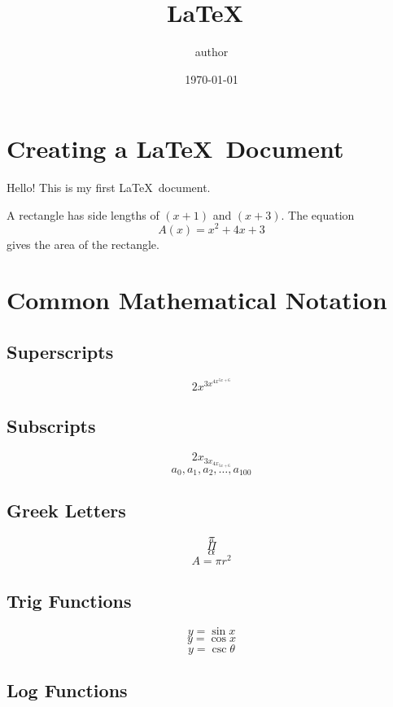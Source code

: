 \documentclass[11pt, a4paper]{article}
\title{ \LaTeX\ }
\author{author}
\date{\today}
\begin{document}
\thispagestyle{empty}
\maketitle
\pagebreak
{}
\setcounter{page}{1}

\tableofcontents
\pagebreak
{}
\setcounter{page}{1}

\pagestyle{fancy}
\fancyhead[L]{ \LaTeX\ }
\fancyhead[R]{\nouppercase{\leftmark}}

\section{Creating a \LaTeX\ Document}
Hello! This is my first \LaTeX\ document.

A rectangle has side lengths of $(x + 1)$ and $(x + 3)$.
The equation $${A(x) = x^2 + 4x + 3}$$ gives the area of the rectangle.

\pagebreak

\section{Common Mathematical Notation}

\subsection{Superscripts}

$$ 2x^{3x^{4x^{5x+6}}} $$

\subsection{Subscripts}

$$ 2x_{3x_{4x_{5x+6}}} $$
$$ a_0, a_1, a_2, \ldots, a_{100} $$

\subsection{Greek Letters}

$$ \pi $$
$$ \Pi $$
$$ \alpha $$
$$ A = \pi r^2 $$

\subsection{Trig Functions}

$$ y = \sin x $$
$$ y = \cos x $$
$$ y = \csc \theta $$

\subsection{Log Functions}
\end{document}
